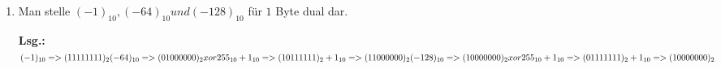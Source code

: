 \documentclass[12pt,a4paper]{scrreprt}
\newcommand{\Lsg}{\par \textbf{Lsg.: \hfill }}
\begin{document}
\begin{enumerate}
\Lsg%

\item Man stelle $(-1)_{10}, (-64)_{10} und (-128)_{10}$ für $1$ Byte dual dar. \\

\Lsg\begin{math}
      (-1)_{10} => (11111111)_2 \\
     (-64)_{10} => (01000000)_2 xor 255_{10} + 1_{10} \\ => (10111111)_2 + 1_{10} => (11000000)_2 \\
    (-128)_{10} => (10000000)_2 xor 255_{10} + 1_{10} \\ => (01111111)_2 + 1_{10} => (10000000)_2 
\end{math}

\end{enumerate}
\end{document}
